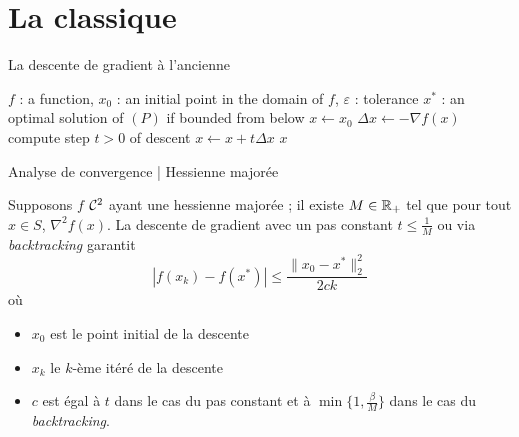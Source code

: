 \documentclass[aspectratio = 169]{beamer}
\begin{document}
\section{La classique}

\begin{frame}{La descente de gradient à l'ancienne}
  \begin{algorithm}[H]
    \caption{Descente de gradient}
    \small{
      \begin{algorithmic}[1]
        \Statex
        \Require $f$ : a function,  $x_0$ : an initial point in the domain of $f$, $\varepsilon$ : tolerance
        \Ensure $x^*$ : an optimal solution of $(P)$ if bounded from below
        \Statex
        \State $x \leftarrow x_0$
        \State $\Delta x \leftarrow - \nabla f(x)$
        \State compute step $t > 0$ of descent
        \State $x \leftarrow x + t\Delta x$
        \EndWhile
        \State \Return $x$
        \EndFunction
        \Statex
      \end{algorithmic}
    }
  \end{algorithm}
\end{frame}

\begin{frame}{Analyse de convergence | Hessienne majorée}
  \begin{prop}
    Supposons $f$ $\mathcal{C}^2$ ayant une hessienne majorée ; il existe
    $M \in \mathbb{R}_+$ tel que pour tout $x \in S$, $\nabla^2f(x)$. La
    descente de gradient avec un pas constant $t \leq \frac{1}{M}$ ou
    via \textit{backtracking} garantit
    \[
      \left| f(x_k) - f(x^*)\right| \leq \frac{\|x_0 - x^*\|_2^2}{2ck}
    \]
    où
    \begin{itemize}
    \item $x_0$ est le point initial de la descente
    \item $x_k$ le $k$-ème itéré de la descente
    \item $c$ est égal à $t$ dans le cas du pas constant et à
      $\min\{1, \frac{\beta}{M}\}$ dans le cas du
      \textit{backtracking}.
    \end{itemize}
  \end{prop}
\end{frame}
\end{document}
